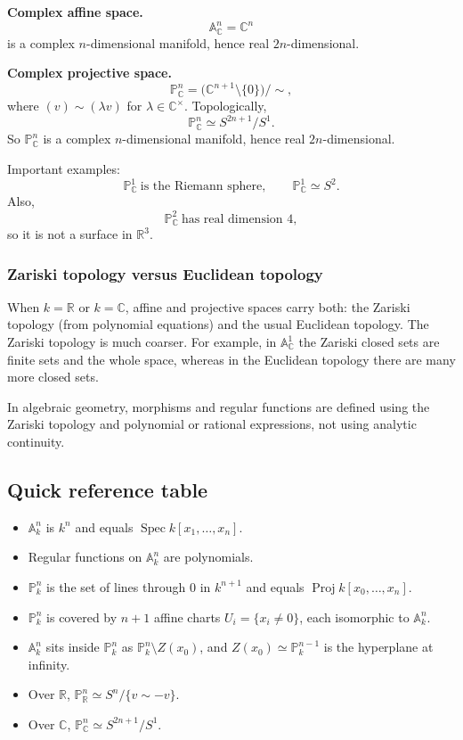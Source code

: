\documentclass[12pt,a4paper]{article}
\theoremstyle{plain}
\theoremstyle{definition}      %
\begin{document}
\textbf{Complex affine space.}
\[
\mathbb A^n_{\mathbb C}=\mathbb C^n
\]
is a complex \(n\)-dimensional manifold, hence real \(2n\)-dimensional.

\textbf{Complex projective space.}
\[
\mathbb P^n_{\mathbb C}
=
\bigl(\mathbb C^{n+1}\setminus\{0\}\bigr)/\sim,
\]
where \((v)\sim(\lambda v)\) for \(\lambda\in\mathbb C^\times\).
Topologically,
\[
\mathbb P^n_{\mathbb C}\simeq S^{2n+1}/S^1.
\]
So \(\mathbb P^n_{\mathbb C}\) is a complex \(n\)-dimensional manifold, hence real \(2n\)-dimensional.

Important examples:
\[
\mathbb P^1_{\mathbb C}\ \text{is the Riemann sphere},
\qquad
\mathbb P^1_{\mathbb C}\simeq S^2.
\]
Also,
\[
\mathbb P^2_{\mathbb C}
\ \text{has real dimension } 4,
\]
so it is not a surface in \(\mathbb R^3\).

\subsubsection*{Zariski topology versus Euclidean topology}

When \(k=\mathbb R\) or \(k=\mathbb C\), affine and projective spaces carry both:
the Zariski topology (from polynomial equations) and the usual Euclidean topology.
The Zariski topology is much coarser.
For example, in \(\mathbb A^1_{\mathbb C}\) the Zariski closed sets are finite sets and the whole space, whereas in the Euclidean topology there are many more closed sets.

In algebraic geometry, morphisms and regular functions are defined using the Zariski topology and polynomial or rational expressions, not using analytic continuity.



\subsection*{Quick reference table}

\begin{itemize}
	\item \(\mathbb A^n_k\) is \(k^n\) and equals \(\operatorname{Spec}k[x_1,\dots,x_n]\).
	\item Regular functions on \(\mathbb A^n_k\) are polynomials.
	\item \(\mathbb P^n_k\) is the set of lines through \(0\) in \(k^{n+1}\) and equals \(\operatorname{Proj}k[x_0,\dots,x_n]\).
	\item \(\mathbb P^n_k\) is covered by \(n+1\) affine charts \(U_i=\{x_i\neq 0\}\), each isomorphic to \(\mathbb A^n_k\).
	\item \(\mathbb A^n_k\) sits inside \(\mathbb P^n_k\) as \(\mathbb P^n_k\setminus Z(x_0)\), and \(Z(x_0)\simeq\mathbb P^{n-1}_k\) is the hyperplane at infinity.
	\item Over \(\mathbb R\), \(\mathbb P^n_{\mathbb R}\simeq S^n/\{v\sim -v\}\).
	\item Over \(\mathbb C\), \(\mathbb P^n_{\mathbb C}\simeq S^{2n+1}/S^1\).
\end{itemize}
\end{document}
